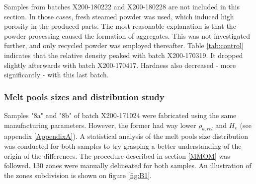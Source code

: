  \begin{center}
\begin{savenotes}
 \begin{table}[ht]
\noindent{}

\caption[Average hardness and relative density measurements for the control cubes of each batch]{Average hardness and relative density measurements for the control cubes of each batch}
\label{tab:control}
\end{table}
\end{savenotes}
 \end{center}

Samples from batches X200-180222 and X200-180228 are not included in this section. In those cases, fresh steamed powder was used, which induced high porosity in the produced parts. The most reasonable explanation is that the powder processing caused the formation of aggregates. This was not investigated further, and only recycled powder was employed thereafter. Table \ref{tab:control} indicates that the relative density peaked with batch X200-170319. It dropped slightly afterwards with batch X200-170417. Hardness also decreased - more significantly - with this last batch.\\

\subsubsection{Melt pools sizes and distribution study}
\label{rs_mps}

Samples "8a" and "8b" of batch X200-171024 were fabricated using the same manufacturing parameters. However, the former had way lower $\rho_{a,rel}$ and $H_v$ (see appendix \ref{AppendixA}). A statistical analysis of the melt pools size distribution was conducted for both samples to try grasping a better understanding of the origin of the differences. The procedure described in section \ref{MMOM} was followed. 130 zones were manually delineated for both samples. An illustration of the zones subdivision is shown on figure \ref{fig:B1}.\\

